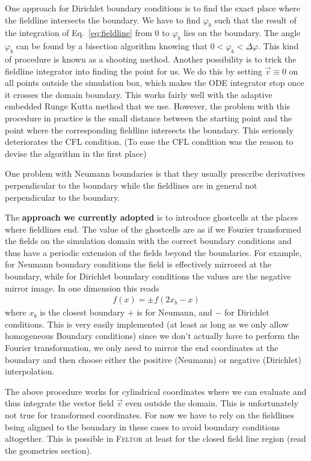 One approach for Dirichlet boundary conditions
is to find the exact place where the fieldline intersects the boundary.
We have to find
$\varphi_b$ such that the result of the integration of Eq.~\eqref{eq:fieldline} from
$0$ to $\varphi_b$ lies on the boundary.
The angle $\varphi_b$ can be found by a bisection algorithm knowing that $0<\varphi_b < \Delta\varphi$.
This kind of procedure is known as a shooting method.
Another possibility is to trick the fieldline integrator into finding the point for us.
We do this by setting $\vec v \equiv 0$ on all points outside the simulation box, which
makes the ODE integrator stop once it crosses the domain boundary.
This works fairly well with the adaptive embedded Runge Kutta method that we use.
However, the problem with this procedure in practice is the small
distance between the starting point and the point where the corresponding
fieldline intersects the boundary. This seriously deteriorates the
CFL condition. (To ease the CFL condition
was the reason to devise the algorithm in the first place)

One problem with Neumann boundaries is that they usually prescribe
derivatives perpendicular to the boundary
while the fieldlines are in general not perpendicular to the boundary.

The \textbf{approach we currently adopted} is to introduce ghostcells at the
places where fieldlines end. The value of the ghostcells are
as if we Fourier transformed the fields on the simulation domain
with the correct boundary conditions and thus have a periodic
extension of the fields beyond the boundaries.
For example, for Neumann boundary
conditions the field is effectively mirrored at the boundary, while for
Dirichlet boundary conditions the values are the negative mirror image. In one
dimension this reads
\begin{align}
f(x) = \pm f(2x_b-x)
\end{align}
where $x_b$ is the closest boundary $+$ is for Neumann, and $-$ for Dirichlet conditions.
This is very easily implemented (at least as long as we only allow
homogeneous Boundary conditions) since we don't actually have to
perform the Fourier transformation, we only need to mirror the end
coordinates at the boundary and then choose either the positive (Neumann) or
negative (Dirichlet) interpolation.

The above procedure works for cylindrical coordinates where we can
evaluate and thus integrate the vector field $\vec v$ even outside the domain.
This is unfortunately not true for transformed coordinates.
For now we have to rely on the fieldlines being aligned to the
boundary in these cases to avoid boundary conditions altogether.
This is possible in \textsc{Feltor} at least for the closed field line region
(read the geometries section).

